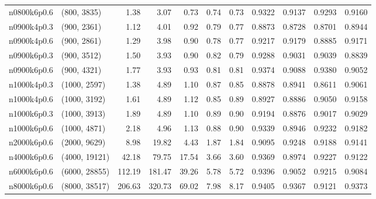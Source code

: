 \begin{tabular}{llrrrrrrrrr}
n0800k6p0.6 &   (800, 3835) &   1.38 &   3.07 &  0.73 &  0.74 &   0.73 &   0.9322 &   0.9137 &     0.9293 &      0.9160 \\
n0900k4p0.3 &   (900, 2361) &   1.12 &   4.01 &  0.92 &  0.79 &   0.77 &   0.8873 &   0.8728 &     0.8701 &      0.8944 \\
n0900k4p0.6 &   (900, 2861) &   1.29 &   3.98 &  0.90 &  0.78 &   0.77 &   0.9217 &   0.9179 &     0.8885 &      0.9171 \\
n0900k6p0.3 &   (900, 3512) &   1.50 &   3.93 &  0.90 &  0.82 &   0.79 &   0.9288 &   0.9031 &     0.9039 &      0.8839 \\
n0900k6p0.6 &   (900, 4321) &   1.77 &   3.93 &  0.93 &  0.81 &   0.81 &   0.9374 &   0.9088 &     0.9380 &      0.9052 \\
n1000k4p0.3 &  (1000, 2597) &   1.38 &   4.89 &  1.10 &  0.87 &   0.85 &   0.8878 &   0.8941 &     0.8611 &      0.9061 \\
n1000k4p0.6 &  (1000, 3192) &   1.61 &   4.89 &  1.12 &  0.85 &   0.89 &   0.8927 &   0.8886 &     0.9050 &      0.9158 \\
n1000k6p0.3 &  (1000, 3913) &   1.89 &   4.89 &  1.10 &  0.89 &   0.90 &   0.9194 &   0.8876 &     0.9017 &      0.9029 \\
n1000k6p0.6 &  (1000, 4871) &   2.18 &   4.96 &  1.13 &  0.88 &   0.90 &   0.9339 &   0.8946 &     0.9232 &      0.9182 \\
n2000k6p0.6 &  (2000, 9629) &   8.98 &  19.82 &  4.43 &  1.87 &   1.84 &   0.9095 &   0.9248 &     0.9188 &      0.9141 \\
n4000k6p0.6 & (4000, 19121) &  42.18 &  79.75 & 17.54 &  3.66 &   3.60 &   0.9369 &   0.8974 &     0.9227 &      0.9122 \\
n6000k6p0.6 & (6000, 28855) & 112.19 & 181.47 & 39.26 &  5.78 &   5.72 &   0.9396 &   0.9052 &     0.9215 &      0.9084 \\
n8000k6p0.6 & (8000, 38517) & 206.63 & 320.73 & 69.02 &  7.98 &   8.17 &   0.9405 &   0.9367 &     0.9121 &      0.9373 \\
\bottomrule
\end{tabular}
